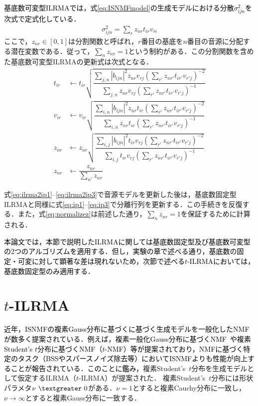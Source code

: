 \textcolor{black}{基底数可変型ILRMAでは，式\eqref{eq:ISNMFmodel}の生成モデルにおける分散$\sigma_{ijn}^2$を次式で定式化している．}
\begin{align}
\sigma_{ijn}^2 = \sum_{r} z_{nr}t_{ir}v_{ri}
\end{align}ここで，$z_{nr}\in [0, 1]$は分割関数と呼ばれ，$r$番目の基底を$n$番目の音源に分配する潜在変数である．従って，$\sum_{n} z_{nr} = 1$という制約がある．この分割関数を含めた基底数可変型ILRMAの更新式は次式となる．
\begin{align}
t_{ir}&\leftarrow t_{ir}\sqrt{\dfrac{\sum _{j,n}\left| b_{ijn}\right| ^{2}z_{nr}v_{rj}\left( \sum _{r'}z_{nr'}t_{ir'}v_{r'j}\right) ^{-2}}{\sum _{j,n}z_{nr}v_{rj}\left( \sum _{r'}z_{nr'}t_{ir'}v_{r'j}\right) ^{-1}}} \label{eq:ilrma2ip1} \\
v_{ir}&\leftarrow v_{ir}\sqrt{\dfrac{\sum _{i,n}\left| b_{ijn}\right| ^{2}z_{nr}t_{ir}\left( \sum _{r'}z_{nr'}t_{ir'}v_{r'j}\right) ^{-2}}{\sum _{i,n}z_{nr}t_{ir}\left( \sum _{r'}z_{nr'}t_{ir'}v_{r'j}\right) ^{-1}}} \label{eq:ilrma2ip2} \\
z_{nr}&\leftarrow z_{nr}\sqrt{\dfrac{\sum _{i,j}\left| b_{ijn}\right| ^{2}t_{ir}v_{rj}\left( \sum _{r'}z_{nr'}t_{ir'}v_{r'j}\right) ^{-2}}{\sum _{i,j}t_{ir}v_{rj}\left( \sum _{r'}z_{nr'}t_{ir'}v_{r'j}\right) ^{-1}}} \label{eq:ilrma2ip3} \\
z_{nr}&\leftarrow \dfrac{z_{nr}}{\sum _{n'}z_{nr}} \label{eq:normalizez}
\end{align}

式\eqref{eq:ilrma2ip1}--\eqref{eq:ilrma2ip3}で音源モデルを更新した後は，基底数固定型ILRMAと同様に式\eqref{eq:ip1}--\eqref{eq:ip3}で分離行列を更新する．この手続きを反復する．また，式\eqref{eq:normalizez}は前述した通り，$\sum_{n} z_{nr} = 1$を保証するために計算される．

\textcolor{black}{本論文では，本節で説明したILRMAに関しては基底数固定型及び基底数可変型の2つのアルゴリズムを適用する．但し，実験の章で述べる通り，基底数の固定・可変に対して顕著な差は現れないため，次節で述べる$t$-ILRMAにおいては，基底数固定型のみ適用する．}

\section{$t$-ILRMA}
\label{sec:conv:tilrma}

\textcolor{black}{近年，ISNMFの複素Gauss分布に基づくに基づく生成モデルを一般化したNMFが数多く提案されている．例えば，複素一般化Gauss分布に基づくNMF~\cite{GGD}や複素Student's $t$分布に基づくNMF（$t$-NMF）\cite{tnmf}等が提案されており，NMFに基づく特定のタスク（BSSやスパースノイズ除去等）においてISNMFよりも性能が向上することが報告されている．このことに鑑み，}複素Student's~$t$分布を生成モデルとして仮定するILRMA（$t$-ILRMA）が提案された\cite{tdist1, tdist2}．
複素Student's~$t$分布には形状パラメタ$\nu~\textgreater~0$がある．$\nu=1$とすると複素Cauchy分布に一致し，$\nu\rightarrow \infty$とすると複素Gauss分布に一致する．

